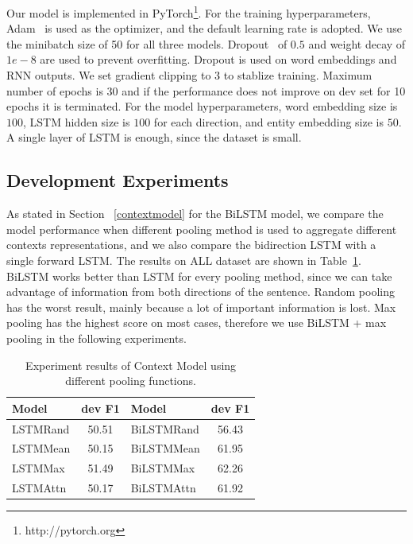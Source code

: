 \documentclass[letterpaper]{article}
\begin{document}
Our model is implemented in PyTorch\footnote{http://pytorch.org}. For the training hyperparameters, Adam~\cite{kingma2014adam} is used as the optimizer, and the default learning rate is adopted. We use the minibatch size of 50 for all three models. Dropout~\cite{hinton2012improving} of $0.5$ and weight decay of $1e-8$ are used to prevent overfitting. Dropout is used on word embeddings and RNN outputs. We set gradient clipping to 3 to stablize training. Maximum number of epochs is 30 and if the performance does not improve on dev set for 10 epochs it is terminated. For the model hyperparameters, word embedding size is $100$, LSTM hidden size is $100$ for each direction, and entity embedding size is $50$. A single layer of LSTM is enough, since the dataset is small.

\subsection{Development Experiments}

As stated in Section ~\ref{contextmodel} for the BiLSTM model, we compare the model performance when different pooling method is used to aggregate different contexts representations, and we also compare the bidirection LSTM with a single forward LSTM. The results on ALL dataset are shown in Table~\ref{table:contextresult}. BiLSTM works better than LSTM for every pooling method, since we can take advantage of information from both directions of the sentence. Random pooling has the worst result, mainly because a lot of important information is lost. Max pooling has the highest score on most cases, therefore we use BiLSTM + max pooling in the following experiments.

\begin{table}[t!]
\centering
\begin{tabular}{l c | l c}
\hline 
{\bf Model} & {\bf dev F1 } & {\bf Model} & {\bf dev F1} \\ 
\hline\hline
LSTMRand & 50.51 & BiLSTMRand & 56.43 \\
LSTMMean & 50.15 & BiLSTMMean & 61.95 \\
LSTMMax & 51.49 & BiLSTMMax  & 62.26 \\
LSTMAttn & 50.17 & BiLSTMAttn & 61.92 \\ 
\hline
\end{tabular}
\caption{Experiment results of Context Model using different pooling functions.}
\label{table:contextresult}
\end{table}
\end{document}
